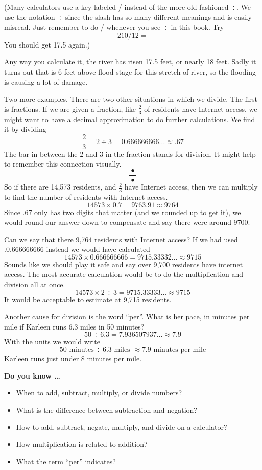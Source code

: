 (Many calculators use a key labeled / instead of the more old fashioned $\div$.  We use the notation $\div$ since the slash has so many different meanings and is easily misread.  Just remember to do / whenever you see $\div$ in this book. Try $$210 / 12 = $$ You should get 17.5 again.)

Any way you calculate it, the river has risen 17.5 feet, or nearly 18 feet. Sadly it turns out that is 6 feet above flood stage for this stretch of river, so the flooding is causing a lot of damage.

Two more examples.  There are two other situations in which we divide.  The first is fractions.  If we are given a fraction, like $\frac{2}{3}$ of residents have Internet access, we might want to have a decimal approximation to do further calculations.  We find it by dividing
$$\frac{2}{3} = 2 \div 3 = 0.666666666... \approx .67$$
The bar in between the 2 and 3 in the fraction stands for division. It might help to remember this connection visually.
$$\frac{~\bullet~}{\bullet}$$
So if there are 14,573 residents, and $\frac{2}{3}$ have Internet access, then we can multiply to find the number of residents with Internet access.
$$14573 \times 0.7 = 9763.91\approx 9764$$
Since .67 only has two digits that matter (and we rounded up to get it), we would round our answer down to compensate and say there were around 9700.

Can we say that there 9,764 residents with Internet access? If we had used .0.666666666 instead we would have calculated
$$14573 \times 0.666666666 = 9715.33332... \approx 9715$$
Sounds like we should play it safe and say over 9,700 residents have internet access.  The most accurate calculation would be to do the multiplication and division all at once.
$$14573 \times 2 \div 3 = 9715.33333... \approx 9715$$
It would be acceptable to estimate at 9,715 residents.

Another cause for division is the word ``per''.  What is her pace, in minutes per mile if Karleen runs 6.3 miles in 50 minutes? 
$$ 50 \div 6.3 =  7.936507937... \approx 7.9$$
With the units we would write
$$ 50 \text{ minutes} \div 6.3 \text{ miles }  \approx 7.9 \text{ minutes per mile}$$
Karleen runs just under 8 minutes per mile.

 

\noindent \textbf{Do you know \ldots}

\begin{itemize}
\item When to add, subtract, multiply, or divide numbers? %
\item What is the difference between subtraction and negation? %
\item How to add, subtract, negate, multiply, and divide on a calculator? %
\item How multiplication is related to addition? %
\item What the term ``per'' indicates? %
  
\end{itemize}

